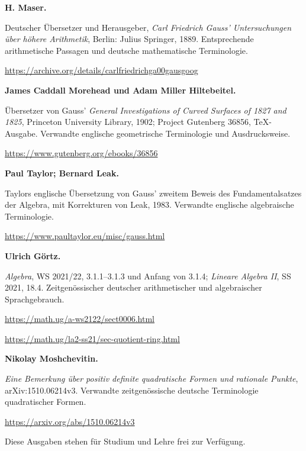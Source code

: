 \par\medskip\noindent\textbf{H. Maser.}\par\nobreak\smallskip\noindent Deutscher Übersetzer und Herausgeber, \emph{Carl Friedrich Gauss' Untersuchungen über höhere Arithmetik}, Berlin: Julius Springer, 1889. Entsprechende arithmetische Passagen und deutsche mathematische Terminologie.\par
\url{https://archive.org/details/carlfriedrichga00gausgoog}
\par\medskip\noindent\textbf{James Caddall Morehead und Adam Miller Hiltebeitel.}\par\nobreak\smallskip\noindent Übersetzer von Gauss' \emph{General Investigations of Curved Surfaces of 1827 and 1825}, Princeton University Library, 1902; Project Gutenberg 36856, TeX-Ausgabe. Verwandte englische geometrische Terminologie und Ausdrucksweise.\par
\url{https://www.gutenberg.org/ebooks/36856}
\par\medskip\noindent\textbf{Paul Taylor; Bernard Leak.}\par\nobreak\smallskip\noindent Taylors englische Übersetzung von Gauss' zweitem Beweis des Fundamentalsatzes der Algebra, mit Korrekturen von Leak, 1983. Verwandte englische algebraische Terminologie.\par
\url{https://www.paultaylor.eu/misc/gauss.html}
\par\medskip\noindent\textbf{Ulrich Görtz.}\par\nobreak\smallskip\noindent \emph{Algebra}, WS 2021/22, 3.1.1–3.1.3 und Anfang von 3.1.4; \emph{Lineare Algebra II}, SS 2021, 18.4. Zeitgenössischer deutscher arithmetischer und algebraischer Sprachgebrauch.\par
\url{https://math.ug/a-ws2122/sect0006.html}\par
\url{https://math.ug/la2-ss21/sec-quotient-ring.html}
\par\medskip\noindent\textbf{Nikolay Moshchevitin.}\par\nobreak\smallskip\noindent \emph{Eine Bemerkung über positiv definite quadratische Formen und rationale Punkte}, arXiv:1510.06214v3. Verwandte zeitgenössische deutsche Terminologie quadratischer Formen.\par
\url{https://arxiv.org/abs/1510.06214v3}


\par Diese Ausgaben stehen für Studium und Lehre frei zur Verfügung.\par

\clearpage\endgroup\clearpage
\setcounter{page}{\the\SavedTranslationPage}
\hypersetup{pageanchor=true}
